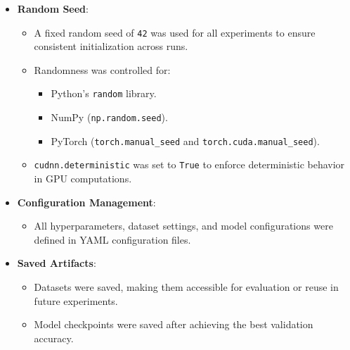 \begin{itemize}
    \item \textbf{Random Seed}: 
    \begin{itemize}
        \item A fixed random seed of \texttt{42} was used for all experiments to ensure consistent initialization across runs.
        \item Randomness was controlled for:
        \begin{itemize}
            \item Python's \texttt{random} library.
            \item NumPy (\texttt{np.random.seed}).
            \item PyTorch (\texttt{torch.manual\_seed} and \texttt{torch.cuda.manual\_seed}).
        \end{itemize}
        \item \texttt{cudnn.deterministic} was set to \texttt{True} to enforce deterministic behavior in GPU computations.
    \end{itemize}
    \item \textbf{Configuration Management}:
    \begin{itemize}
        \item All hyperparameters, dataset settings, and model configurations were defined in YAML configuration files.
    \end{itemize}
    \item \textbf{Saved Artifacts}:
    \begin{itemize}
        \item Datasets were saved, making them accessible for evaluation or reuse in future experiments.
        \item Model checkpoints were saved after achieving the best validation accuracy.
    \end{itemize}
\end{itemize}
